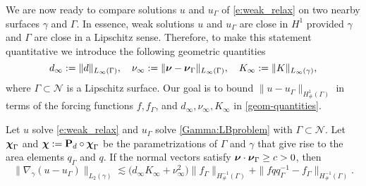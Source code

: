 We are now ready to compare solutions $u$ and $u_\Gamma$
of \eqref{e:weak_relax} on two nearby surfaces $\gamma$ and $\Gamma$.
In essence, weak solutions $u$ and $u_\Gamma$ are close in $H^1$ provided
$\gamma$ and $\Gamma$ are close in a Lipschitz sense.
Therefore, to make this statement quantitative we
introduce the following geometric quantities
%
\begin{equation}\label{geom-quantities}
d_\infty := \|d\|_{L_\infty(\Gamma)},
\quad
\nu_\infty := \|{\boldsymbol \nu}-{\boldsymbol \nu}_\Gamma\|_{L_\infty(\Gamma)},
\quad
K_\infty := \|K\|_{L_\infty(\gamma)},
\end{equation}
%
where $\Gamma\subset\mathcal{N}$ is a Lipschitz surface.
Our goal is to bound $\|u-u_\Gamma\|_{H_\#^1(\Gamma)}$ in terms of the forcing functions
$f,f_\Gamma$, and $d_\infty, \nu_\infty, K_\infty$ in \eqref{geom-quantities}.
%
\begin{lemma}\label{L:perturbation_bound_dist}
Let $u$ solve \eqref{e:weak_relax} and $u_\Gamma$ solve \eqref{Gamma:LBproblem}
with $\Gamma \subset \mathcal N$.
Let ${\boldsymbol \chi}_\Gamma$ and ${\boldsymbol \chi} := {\bf P}_d \circ {\boldsymbol \chi}_\Gamma$ be the parametrizations
of $\Gamma$ and $\gamma$ that give rise to the area elements $q_\Gamma$ and $q$.
If the normal vectors satisfy  ${\boldsymbol \nu}\cdot{\boldsymbol \nu}_\Gamma \ge c >0$, then
%
\begin{equation}\label{perturbation_bound_dist}
  \|\nabla_\gamma(u-u_\Gamma)\|_{L_2(\gamma)} \lesssim
  \big(d_\infty K_\infty+\nu_\infty^2\big) \|f_\Gamma\|_{H^{-1}_\#(\Gamma)}
  + \|f q q_\Gamma^{-1}-f_\Gamma\|_{H^{-1}_\#(\Gamma)}.
\end{equation}
\end{lemma}
%
